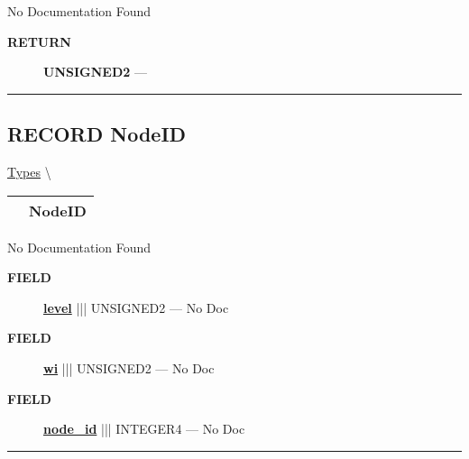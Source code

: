 No Documentation Found








\par
\begin{description}
\item [\colorbox{tagtype}{\color{white} \textbf{\textsf{RETURN}}}] \textbf{UNSIGNED2} --- 
\end{description}




\rule{\linewidth}{0.5pt}
\subsection*{\textsf{\colorbox{headtoc}{\color{white} RECORD}
NodeID}}

\hypertarget{ecldoc:ml_core.types.nodeid}{}
\hspace{0pt} \hyperlink{ecldoc:ML_Core.Types}{Types} \textbackslash 

{\renewcommand{\arraystretch}{1.5}
\begin{tabularx}{\textwidth}{|>{\raggedright\arraybackslash}l|X|}
\hline
\hspace{0pt}\mytexttt{\color{red} } & \textbf{NodeID} \\
\hline
\end{tabularx}
}

\par





No Documentation Found







\par
\begin{description}
\item [\colorbox{tagtype}{\color{white} \textbf{\textsf{FIELD}}}] \textbf{\underline{level}} ||| UNSIGNED2 --- No Doc
\item [\colorbox{tagtype}{\color{white} \textbf{\textsf{FIELD}}}] \textbf{\underline{wi}} ||| UNSIGNED2 --- No Doc
\item [\colorbox{tagtype}{\color{white} \textbf{\textsf{FIELD}}}] \textbf{\underline{node\_id}} ||| INTEGER4 --- No Doc
\end{description}





\rule{\linewidth}{0.5pt}


